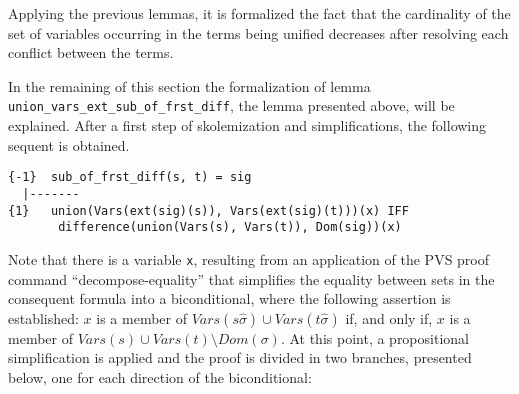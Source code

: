 \documentclass[submission,copyright,creativecommons]{eptcs}
\begin{document}
  Applying the previous lemmas, it is formalized the fact that the
  cardinality of the set of variables occurring in the terms being
  unified decreases after resolving each conflict between the terms.


  In the remaining of this section the formalization of lemma {\tt
    union\_vars\_ext\_sub\_of\_frst\_diff}, the lemma presented above, will be
  explained.  After a first step of skolemization and simplifications,
  the following sequent is obtained.

  {\small
\begin{verbatim}
{-1}  sub_of_frst_diff(s, t) = sig
  |-------
{1}   union(Vars(ext(sig)(s)), Vars(ext(sig)(t)))(x) IFF
       difference(union(Vars(s), Vars(t)), Dom(sig))(x)
\end{verbatim}
  }

  Note that there is a variable {\tt x}, resulting from an application
  of the PVS proof command ``decompose-equality'' that simplifies the
  equality between sets in the consequent formula into a
  biconditional, where the following assertion is established: $x$ is
  a member of $Vars(s\hat{\sigma}) \cup Vars(t\hat{\sigma})$ if, and
  only if, $x$ is a member of $Vars(s) \cup Vars(t) \setminus
  Dom(\sigma)$. At this point, a propositional simplification is
  applied and the proof is divided in two branches, presented below,
  one for each direction of the biconditional:
\end{document}

